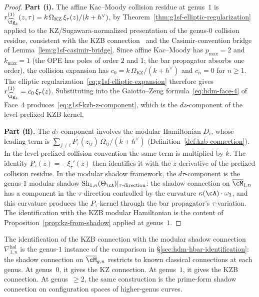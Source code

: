 \begin{proof}
\textbf{Part (i).} The affine Kac--Moody collision residue at
genus~$1$ is
$r_{\widehat{\fg}_k}^{(1)}(z, \tau) = k\,\Omega_{\mathrm{KZ}}\, \xi_\tau(z)/(k + h^\vee)$,
by Theorem~\ref{thm:g1sf-elliptic-regularization} applied to the
KZ/Sugawara-normalized presentation of the genus-$0$ collision residue,
consistent with the KZB connection~\cite{Bernard88} and the
Casimir-convention bridge of Lemma~\ref{lem:g1sf-casimir-bridge}.
Since affine Kac--Moody has
$p_{\max} = 2$ and $k_{\max} = 1$ (the OPE has poles of order
$2$ and $1$; the bar propagator absorbs one order), the
collision expansion has $c_0 = k\,\Omega_{\mathrm{KZ}}/(k+h^\vee)$
and $c_n = 0$ for $n \geq 1$. The
elliptic regularization~\eqref{eq:g1sf-elliptic-expansion} therefore
gives $r_{\widehat{\fg}_k}^{(1)} = c_0\, \xi_\tau(z)$.
Substituting into the Gaiotto--Zeng formula~\eqref{eq:hdm-face-4}
of Face~4 produces~\eqref{eq:g1sf-kzb-z-component}, which is the
$dz$-component of the level-prefixed KZB kernel.

\textbf{Part (ii).} The $d\tau$-component involves the
modular Hamiltonian $D_i$, whose leading term is
$\sum_{j \neq i}P_\tau(z_{ij})\, \Omega_{ij}/(k + h^\vee)$
(Definition~\ref{def:kzb-connection}). In the level-prefixed
collision convention the same term is multiplied by $k$. The identity
$P_\tau(z) = -\xi_\tau'(z)$ then identifies it with the
$z$-derivative of the prefixed collision residue. In the modular shadow
framework, the $d\tau$-component is the genus-$1$ modular shadow
$\mathrm{Sh}_{1,n}(\Theta_\cA)|_{\tau\text{-direction}}$: the
shadow connection on $\overline{\cM}_{1,n}$ has a component in the
$\tau$-direction controlled by the curvature
$\kappa(\cA) \cdot \omega_1$, and this curvature produces the
$P_\tau$-kernel through the bar propagator's $\tau$-variation.
The identification with the KZB modular
Hamiltonian is the content of
Proposition~\ref{prop:kz-from-shadow} applied at genus~$1$.
\end{proof}

\begin{remark}
\label{rem:g1sf-kzb-shadow}
The identification of the KZB connection with the modular shadow
connection $\nabla^{\mathrm{hol}}_{1,n}$ is the genus-$1$ instance
of the comparison in
\S\ref{sec:hdm-hbar-identification}: the shadow connection on
$\overline{\cM}_{g,n}$ restricts to known classical connections at
each genus. At genus~$0$, it gives the KZ connection. At genus~$1$,
it gives the KZB connection. At genus~$\geq 2$, the same construction
is the prime-form shadow connection on configuration spaces of
higher-genus curves.
\end{remark}


